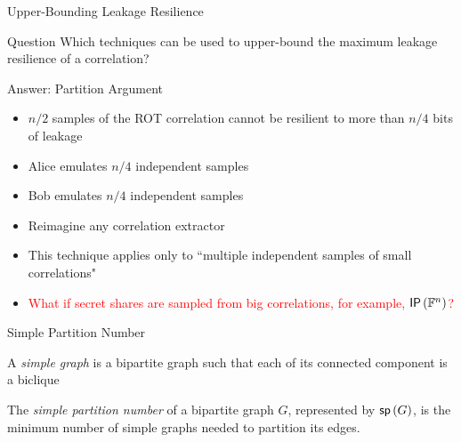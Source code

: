 \begin{frame}{Upper-Bounding Leakage Resilience}

{
	\begin{block}{Question}
		Which techniques can be used to upper-bound the maximum leakage resilience of a correlation?
	\end{block}
}
{
	\begin{block}{Answer: Partition Argument}
		\begin{itemize}
			\item $ n/2 $ samples of the ROT correlation cannot be resilient to more than $ n/4 $ bits of leakage
			\item Alice emulates $ n/4 $ independent samples
			\item Bob emulates $ n/4 $ independent samples
			\item Reimagine any correlation extractor
		\end{itemize}		
	\end{block}
}

\begin{itemize}
	\item This technique applies only to ``multiple independent samples of small correlations"
	\item \textcolor{red}{What if secret shares are sampled from big correlations, for example, $ \IP[\bbF^n] $?}
\end{itemize}

\end{frame}

\begin{frame}{Simple Partition Number}
	\begin{definition}
		A \textit{simple graph} is a bipartite graph such that each of its
		connected component is a biclique
	\end{definition}
	\pause
	\begin{definition}
		The \textit{simple partition number} of a bipartite graph $G$, represented
		by $\sp G$, is the minimum number of simple graphs needed to
		partition its edges.
	\end{definition}
	\pause
	
\end{frame}

